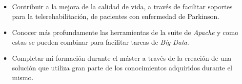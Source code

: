 \begin{itemize}
	\item Contribuir a la mejora de la calidad de vida, a través de facilitar soportes para la telerehabilitación, de pacientes con enfermedad de Parkinson.
	\item Conocer más profundamente las herramientas de la suite de \textit{Apache} y como estas se pueden combinar para facilitar tareas de \textit{Big Data}.
	\item Completar mi formación durante el máster a través de la creación de una solución que utiliza gran parte de los conocimientos adquiridos durante el mismo.
\end{itemize}

